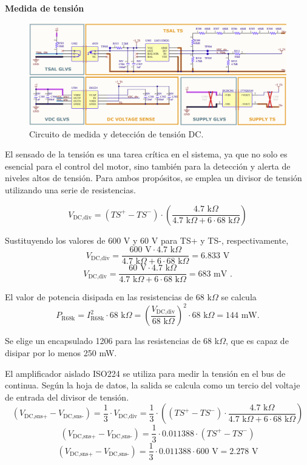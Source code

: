\textbf{Medida de tensión}

\begin{figure}[H]
	\centering
	\includegraphics[width=0.8\linewidth]{fig/Vmeas-sch}
	\caption{Circuito de medida y detección de tensión DC.}
\end{figure}

El sensado de la tensión es una tarea crítica en el sistema, ya que no solo es esencial para el control del motor, sino también para la detección y alerta de niveles altos de tensión. Para ambos propósitos, se emplea un divisor de tensión utilizando una serie de resistencias. 

\[ V_{\text{DC,div}} = \left(TS^+ - TS^-\right) \cdot \left( \frac{4.7 \text{ k}\Omega}{4.7 \text{ k}\Omega + 6 \cdot 68 \text{ k}\Omega} \right) \]

Sustituyendo los valores de 600 V y 60 V para TS+ y TS-, respectivamente,
\[ V_{\text{DC,div}} = \frac{600 \text{ V} \cdot 4.7 \text{ k}\Omega}{4.7 \text{ k}\Omega + 6 \cdot 68 \text{ k}\Omega} = 6.833 \text{ V} \]
\[ V_{\text{DC,div}} = \frac{60 \text{ V} \cdot 4.7 \text{ k}\Omega}{4.7 \text{ k}\Omega + 6 \cdot 68 \text{ k}\Omega} = 683 \text{ mV .} \]

El valor de potencia disipada en las resistencias de 68 k$\Omega$ se calcula 
\[ P_{\text{R68k}} = I_{\text{R68k}}^2 \cdot 68\text{ k}\Omega = \left( \frac{V_{\text{DC,div}}}{68\text{ k}\Omega} \right)^2 \cdot 68 \text{ k}\Omega = 144 \text{ mW.} \]

Se elige un encapsulado 1206 para las resistencias de 68 k$\Omega$, que es capaz de disipar por lo menos 250 mW.

El amplificador aislado ISO224 se utiliza para medir la tensión en el bus de continua. Según la hoja de datos, la salida se calcula como un tercio del voltaje de entrada del divisor de tensión.
\[ (V_{\text{DC,sns+}} - V_{\text{DC,sns-}}) = \frac{1}{3} \cdot V_{\text{DC,div}} = \frac{1}{3} \cdot \left( (TS^+ - TS^-) \cdot \frac{4.7 \text{ k}\Omega}{4.7 \text{ k}\Omega + 6 \cdot 68 \text{ k}\Omega} \right) \]
\[ (V_{\text{DC,sns+}} - V_{\text{DC,sns-}}) = \frac{1}{3} \cdot 0.011388 \cdot (TS^+ - TS^-) \]
\[ (V_{\text{DC,sns+}} - V_{\text{DC,sns-}}) = \frac{1}{3} \cdot 0.011388 \cdot 600 \text{ V} = 2.278 \text{ V} \]

